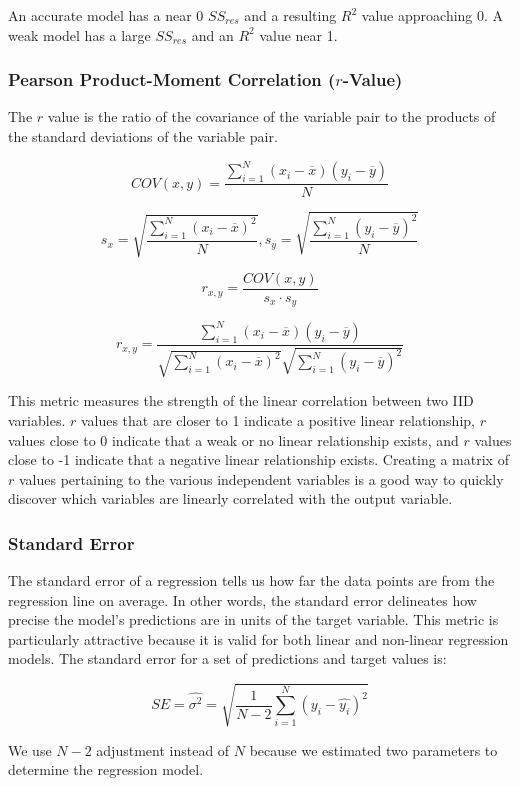 \documentclass{article}
\begin{document}
\noindent
An accurate model has a near 0 $SS_{res}$ and a resulting $R^2$ value approaching 0. A weak model has a large $SS_{res}$ and an $R^2$ value near 1.

\subsubsection*{Pearson Product-Moment Correlation ($r$-Value)}
The $r$ value is the ratio of the covariance of the variable pair to the products of the standard deviations of the variable pair. 

\[COV(x, y) = \frac{\sum_{i=1}^{N}(x_i - \overline{x})(y_i - \overline{y})}{N}\]

\[s_x = \sqrt{\frac{\sum_{i=1}^{N}(x_i - \overline{x})^2}{N}}, s_y = \sqrt{\frac{\sum_{i=1}^{N}(y_i - \overline{y})^2}{N}}\]

\[r_{x, y} = \frac{COV(x, y)}{s_x \cdot s_y}\]

\[r_{x, y} = \frac{\sum_{i=1}^{N}(x_i - \overline{x})(y_i - \overline{y})}{\sqrt{\sum_{i=1}^{N}(x_i - \overline{x})^2}\sqrt{\sum_{i=1}^{N}(y_i - \overline{y})^2}}\]

\noindent
This metric measures the strength of the linear correlation between two IID variables. $r$ values that are closer to 1 indicate a positive linear relationship, $r$ values close to 0 indicate that a weak or no linear relationship exists, and $r$ values close to -1 indicate that a negative linear relationship exists. Creating a matrix of $r$ values pertaining to the various independent variables is a good way to quickly discover which variables are linearly correlated with the output variable. 

\subsubsection*{Standard Error}
The standard error of a regression tells us how far the data points are from the regression line on average. In other words, the standard error delineates how precise the model's predictions are in units of the target variable. This metric is particularly attractive because it is valid for both linear and non-linear regression models. The standard error for a set of predictions and target values is:

\[SE = \hat{\sigma^2} = \sqrt{\frac{1}{N-2}\sum_{i=1}^{N}(y_i - \hat{y_i})^2}\]

\noindent
We use $N-2$ adjustment instead of $N$ because we estimated two parameters to determine the regression model.
\end{document}

